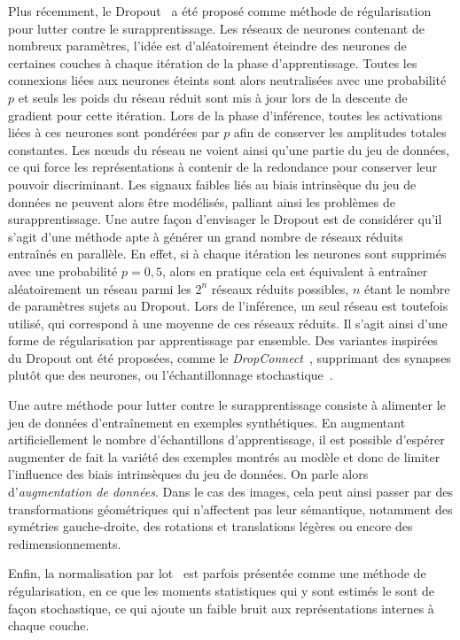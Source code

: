 Plus récemment, le Dropout~\cite{srivastava_dropout_2014} a été proposé comme méthode de régularisation pour lutter contre le surapprentissage. Les réseaux de neurones contenant de nombreux paramètres, l'idée est d'aléatoirement éteindre des neurones de certaines couches à chaque itération de la phase d'apprentissage. Toutes les connexions liées aux neurones éteints sont alors neutralisées avec une probabilité $p$ et seuls les poids du réseau réduit sont mis à jour lors de la descente de gradient pour cette itération. Lors de la phase d'inférence, toutes les activations liées à ces neurones sont pondérées par $p$ afin de conserver les amplitudes totales constantes. Les n\oe{}uds du réseau ne voient ainsi qu'une partie du jeu de données, ce qui force les représentations à contenir de la redondance pour conserver leur pouvoir discriminant. Les signaux faibles liés au biais intrinsèque du jeu de données ne peuvent alors être modélisés, palliant ainsi les problèmes de surapprentissage. Une autre façon d'envisager le Dropout est de considérer qu'il s'agit d'une méthode apte à générer un grand nombre de réseaux réduits entraînés en parallèle. En effet, si à chaque itération les neurones sont supprimés avec une probabilité $p = 0,5$, alors en pratique cela est équivalent à entraîner aléatoirement un réseau parmi les $2^n$ réseaux réduits possibles, $n$ étant le nombre de paramètres sujets au Dropout. Lors de l'inférence, un seul réseau est toutefois utilisé, qui correspond à une moyenne de ces réseaux réduits. Il s'agit ainsi d'une forme de régularisation par apprentissage par ensemble. Des variantes inspirées du Dropout ont été proposées, comme le \emph{DropConnect}~\cite{wan_regularization_2013}, supprimant des synapses plutôt que des neurones, ou l'échantillonnage stochastique~\cite{zeiler_stochastic_2013}.

Une autre méthode pour lutter contre le surapprentissage consiste à alimenter le jeu de données d'entraînement en exemples synthétiques. En augmentant artificiellement le nombre d'échantillons d'apprentissage, il est possible d'espérer augmenter de fait la variété des exemples montrés au modèle et donc de limiter l'influence des biais intrinsèques du jeu de données. On parle alors d'\emph{augmentation de données}. Dans le cas des images, cela peut ainsi passer par des transformations géométriques qui n'affectent pas leur sémantique, notamment des symétries gauche-droite, des rotations et translations légères ou encore des redimensionnements.

Enfin, la normalisation par lot~\cite{ioffe_batch_2015} est parfois présentée comme une méthode de régularisation, en ce que les moments statistiques qui y sont estimés le sont de façon stochastique, ce qui ajoute un faible bruit aux représentations internes à chaque couche.

